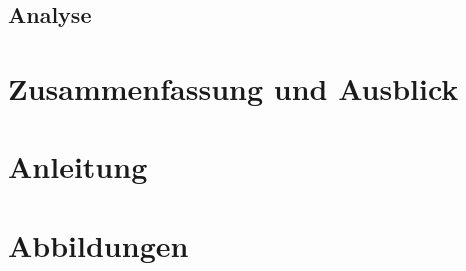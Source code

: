 \documentclass[
    11pt, %
    DIV=11,
    ngerman, %
    a4paper, %
    twoside, %
    titlepage, %
    parskip=half, %
    headings=normal, %
    listof=totoc, %
    bibliography=totoc, %
    index=totoc, %
    captions=tableheading, %
    final %
]{scrreprt}
\begin{document}
	\section{Analyse}
		

\chapter{Zusammenfassung und Ausblick}
	

\renewcommand{\refname}{Literatur- und Webverzeichnis}
\RaggedRight


\begin{appendix}
    \chapter{Anleitung}
    \label{sec:Anhang}
    \setdefaultleftmargin{1em}{}{}{}{}{}
    
    \chapter{Abbildungen}
    \setdefaultleftmargin{1em}{}{}{}{}{}
    
\end{appendix}

\end{document}
